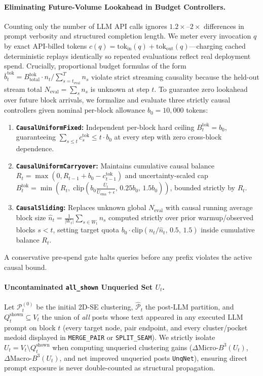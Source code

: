 \paragraph{Eliminating Future-Volume Lookahead in Budget Controllers.}
Counting only the number of LLM API calls ignores $1.2\times$--$2\times$ differences in prompt verbosity and structured completion length. We meter every invocation $q$ by exact API-billed tokens $c(q) = \text{tok}_{\text{in}}(q) + \text{tok}_{\text{out}}(q)$---charging cached deterministic replays identically so repeated evaluations reflect real deployment spend. Crucially, proportional budget formulas of the form $\bar{b}_t^{\text{tok}} = B_{\text{total}}^{\text{tok}} \cdot n_t / \sum_{s=t_{\text{eval}}}^{T} n_s$ violate strict streaming causality because the held-out stream total $N_{\text{eval}} = \sum_{s} n_s$ is unknown at step $t$. To guarantee zero lookahead over future block arrivals, we formalize and evaluate three strictly causal controllers given nominal per-block allowance $b_0 = 10{,}000$ tokens:
\begin{enumerate}
    \item \textbf{\texttt{CausalUniformFixed}:} Independent per-block hard ceiling $B_t^{\text{tok}} = b_0$, guaranteeing $\sum_{s \le t} c_s^{\text{tok}} \le t \cdot b_0$ at every step with zero cross-block dependence.
    \item \textbf{\texttt{CausalUniformCarryover}:} Maintains cumulative causal balance $R_t = \max(0, R_{t-1} + b_0 - c_{t-1}^{\text{tok}})$ and uncertainty-scaled cap $B_t^{\text{tok}} = \min\!\left(R_t,\; \text{clip}\!\left(b_0 \frac{\bar{U}_t}{\bar{U}_{\text{ema}}+\epsilon},\, 0.25 b_0,\, 1.5 b_0\right)\right)$, bounded strictly by $R_t$.
    \item \textbf{\texttt{CausalSliding}:} Replaces unknown global $N_{\text{eval}}$ with causal running average block size $\hat{n}_t = \frac{1}{|W_t|}\sum_{s \in W_t} n_s$ computed strictly over prior warmup/observed blocks $s < t$, setting target quota $b_0 \cdot \text{clip}(n_t / \hat{n}_t,\, 0.5,\, 1.5)$ inside cumulative balance $R_t$.
\end{enumerate}
A conservative pre-spend gate halts queries before any prefix violates the active causal bound.

\paragraph{Uncontaminated \texttt{all\_shown} Unqueried Set $U_t$.}
Let $\mathcal{P}_t^{(0)}$ be the initial 2D-SE clustering, $\widehat{\mathcal{P}}_t$ the post-LLM partition, and $Q_t^{\text{shown}} \subseteq V_t$ the union of \emph{all} posts whose text appeared in any executed LLM prompt on block $t$ (every target node, pair endpoint, and every cluster/pocket medoid displayed in \texttt{MERGE\_PAIR} or \texttt{SPLIT\_SEAM}). We strictly isolate $U_t = V_t \setminus Q_t^{\text{shown}}$ when computing unqueried clustering gains ($\Delta\text{Micro-}B^3(U_t)$, $\Delta\text{Macro-}B^3(U_t)$, and net improved unqueried posts \texttt{UnqNet}), ensuring direct prompt exposure is never double-counted as structural propagation.

